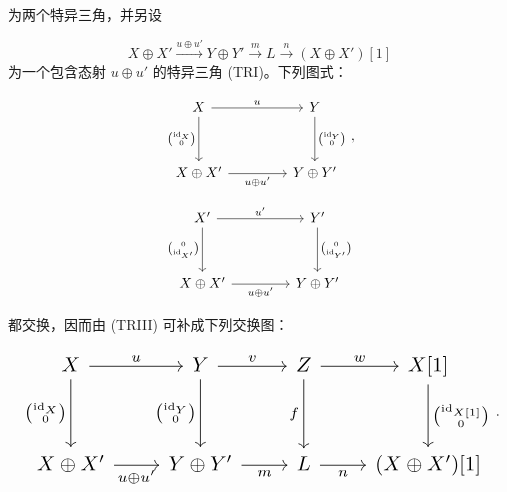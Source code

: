 \clearpage
{}%
\begingroup
\small
\setlength{\abovedisplayskip}{4pt plus 2pt minus 2pt}%
\setlength{\belowdisplayskip}{4pt plus 2pt minus 2pt}%

为两个特异三角，并另设

\[
  X\oplus X'\xrightarrow{u\oplus u'}Y\oplus Y'
  \xrightarrow{m}L\xrightarrow{n}(X\oplus X')[1]
\]
为一个包含态射 $u\oplus u'$ 的特异三角 (TRI)。下列图式：

\begin{equation*}
  \begin{tikzcd}[column sep=4.2em,row sep=3.2em]
    X \arrow[r,"u"] \arrow[d,"{\binom{\operatorname{id}_X}{0}}"']
      & Y \arrow[d,"{\binom{\operatorname{id}_Y}{0}}"] \\
    X\oplus X' \arrow[r,"{u\oplus u'}"']
      & Y\oplus Y'
  \end{tikzcd}
  \,,
\end{equation*}

\begin{equation*}
  \begin{tikzcd}[column sep=4.2em,row sep=3.2em]
    X' \arrow[r,"{u'}"] \arrow[d,"{\binom{0}{\operatorname{id}_{X'}}}"']
      & Y' \arrow[d,"{\binom{0}{\operatorname{id}_{Y'}}}"] \\
    X\oplus X' \arrow[r,"{u\oplus u'}"']
      & Y\oplus Y'
  \end{tikzcd}
\end{equation*}

都交换，因而由 (TRIII) 可补成下列交换图：

\begin{equation*}
  \resizebox{0.98\linewidth}{!}{%
    $\begin{tikzcd}[ampersand replacement=\&,column sep=2.25em,row sep=3.1em]
      X \arrow[r,"u"] \arrow[d,"{\binom{\operatorname{id}_X}{0}}"']
        \& Y \arrow[r,"v"] \arrow[d,"{\binom{\operatorname{id}_Y}{0}}"']
        \& Z \arrow[r,"w"] \arrow[d,"f"']
        \& X[1] \arrow[d,"{\binom{\operatorname{id}_{X[1]}}{0}}"] \\
      X\oplus X' \arrow[r,"{u\oplus u'}"']
        \& Y\oplus Y' \arrow[r,"m"']
        \& L \arrow[r,"n"']
        \& (X\oplus X')[1]
    \end{tikzcd}$%
  }\,.
\end{equation*}

